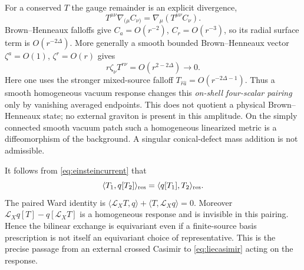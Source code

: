 \documentclass[11pt,a4paper]{article}
\numberwithin{equation}{section}
\theoremstyle{remark}\newtheorem{remark}[theorem]{Remark}
\begin{document}
For a conserved $T$ the gauge remainder is an explicit divergence,
\begin{equation}
 T^{\mu\nu}\nabla_{(\mu}C_{\nu)}
 =\nabla_\mu(T^{\mu\nu}C_\nu).
\end{equation}
Brown--Henneaux falloffs give $C_a=O(r^{-2})$, $C_r=O(r^{-3})$, so its radial surface term is $O(r^{-2\Delta})$. More generally a smooth bounded Brown--Henneaux vector $\zeta^a=O(1)$, $\zeta^r=O(r)$ gives
\begin{equation}
 r\zeta_\nu T^{r\nu}=O(r^{2-2\Delta})\longrightarrow0.
 \label{eq:largegaugepair}
\end{equation}
Here one uses the stronger mixed-source falloff $T_{\hat r\hat a}=O(r^{-2\Delta-1})$. Thus a smooth homogeneous vacuum response changes this \emph{on-shell four-scalar pairing} only by vanishing averaged endpoints. This does not quotient a physical Brown--Henneaux state; no external graviton is present in this amplitude. On the simply connected smooth vacuum patch such a homogeneous linearized metric is a diffeomorphism of the background. A singular conical-defect mass addition is not admissible.

It follows from \eqref{eq:einsteincurrent} that
\begin{equation}
 \langle T_1,q[T_2]\rangle_{\rm res}
 =\langle q[T_1],T_2\rangle_{\rm res}.
 \label{eq:reciprocity}
\end{equation}
The paired Ward identity is
$\langle\mathcal L_XT,q\rangle+\langle T,\mathcal L_Xq\rangle=0$.
Moreover $\mathcal L_Xq[T]-q[\mathcal L_XT]$ is a homogeneous response and is invisible in this pairing. Hence the bilinear exchange is equivariant even if a finite-source basis prescription is not itself an equivariant choice of representative. This is the precise passage from an external crossed Casimir to \eqref{eq:liecasimir} acting on the response.
\end{document}
